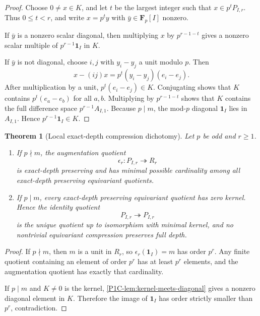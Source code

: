 \documentclass[11pt]{article}
\newtheorem{theorem}{Theorem}[section]
\theoremstyle{remark}
\newcommand{\F}{\mathbf F}
\begin{document}
\begin{proof}
Choose \(0\ne x\in K\), and let \(t\) be the largest integer such that \(x\in p^tP_{I,r}\).  Thus \(0\le t<r\), and write \(x=p^t y\) with \(\bar y\in\F_p[I]\) nonzero.

If \(\bar y\) is a nonzero scalar diagonal, then multiplying \(x\) by \(p^{r-1-t}\) gives a nonzero scalar multiple of \(p^{r-1}\mathbf1_I\) in \(K\).

If \(\bar y\) is not diagonal, choose \(i,j\) with \(y_i-y_j\) a unit modulo \(p\).  Then
\[
 x-(ij)x=p^t(y_i-y_j)(e_i-e_j).
\]
After multiplication by a unit, \(p^t(e_i-e_j)\in K\).  Conjugating shows that \(K\) contains \(p^t(e_a-e_b)\) for all \(a,b\).  Multiplying by \(p^{r-1-t}\) shows that \(K\) contains the full difference space \(p^{r-1}A_{I,1}\).  Because \(p\mid m\), the mod-\(p\) diagonal \(\mathbf1_I\) lies in \(A_{I,1}\).  Hence \(p^{r-1}\mathbf1_I\in K\).
\end{proof}

\begin{theorem}[Local exact-depth compression dichotomy]\label{P1C-thm:local-compression}
Let \(p\) be odd and \(r\ge1\).
\begin{enumerate}[label=\textup{(\roman*)}]
\item If \(p\nmid m\), the augmentation quotient
\[
 \epsilon_r:P_{I,r}\twoheadrightarrow R_r
\]
is exact-depth preserving and has minimal possible cardinality among all exact-depth preserving equivariant quotients.
\item If \(p\mid m\), every exact-depth preserving equivariant quotient has zero kernel.  Hence the identity quotient
\[
 P_{I,r}\twoheadrightarrow P_{I,r}
\]
is the unique quotient up to isomorphism with minimal kernel, and no nontrivial equivariant compression preserves full depth.
\end{enumerate}
\end{theorem}

\begin{proof}
If \(p\nmid m\), then \(m\) is a unit in \(R_r\), so \(\epsilon_r(\mathbf1_I)=m\) has order \(p^r\).  Any finite quotient containing an element of order \(p^r\) has at least \(p^r\) elements, and the augmentation quotient has exactly that cardinality.

If \(p\mid m\) and \(K\ne0\) is the kernel, \cref{P1C-lem:kernel-meets-diagonal} gives a nonzero diagonal element in \(K\).  Therefore the image of \(\mathbf1_I\) has order strictly smaller than \(p^r\), contradiction.
\end{proof}
\end{document}
